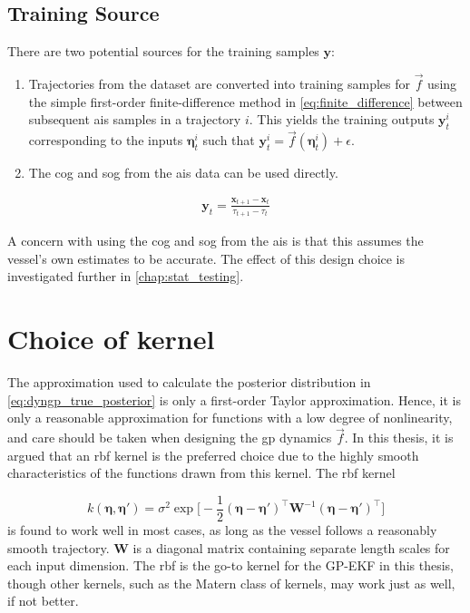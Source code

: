 \subsection{Training Source}
There are two potential sources for the training samples $\boldsymbol{y}$:

\begin{enumerate}
    \item Trajectories from the dataset are converted into training samples for $\vec{f}$ using the simple first-order finite-difference method in \cref{eq:finite_difference} between subsequent \acrshort{ais} samples in a trajectory $i$. This yields the training outputs $\boldsymbol{y}_t^{i}$ corresponding to the inputs $\boldsymbol{\eta}_t^i$ such that $\boldsymbol{y}_t^i = \vec{f}(\boldsymbol{\eta}_t^i) + \epsilon$.
    \item The \acrshort{cog} and \acrshort{sog} from the \acrshort{ais} data can be used directly.
\end{enumerate}

\begin{align}\label{eq:finite_difference}
    \boldsymbol{y}_t = \frac{\boldsymbol{x}_{t+1} - \boldsymbol{x}_t}{\tau_{t+1} - \tau_t}
\end{align}

A concern with using the \acrshort{cog} and \acrshort{sog} from the \acrshort{ais} is that this assumes the vessel's own estimates to be accurate. The effect of this design choice is investigated further in \cref{chap:stat_testing}.


\section{Choice of kernel}
The approximation used to calculate the posterior distribution in \cref{eq:dyngp_true_posterior} is only a first-order Taylor approximation. Hence, it is only a reasonable approximation for functions with a low degree of nonlinearity, and care should be taken when designing the \acrshort{gp} dynamics $\vec{f}$. In this thesis, it is argued that an \acrshort{rbf} kernel is the preferred choice due to the highly smooth characteristics of the functions drawn from this kernel. The \acrshort{rbf} kernel

\begin{equation}\label{eq:dyngp_kernel}
    k(\boldsymbol{\eta}, \boldsymbol{\eta}') = \sigma^2 \exp \big[ - \frac{1}{2} (\boldsymbol{\eta} - \boldsymbol{\eta}')^\intercal \boldsymbol{W}^{-1} (\boldsymbol{\eta} - \boldsymbol{\eta}')^\intercal\big]
\end{equation}
is found to work well in most cases, as long as the vessel follows a reasonably smooth trajectory. $\boldsymbol{W}$ is a diagonal matrix containing separate length scales for each input dimension. The \acrshort{rbf} is the go-to kernel for the GP-EKF in this thesis, though other kernels, such as the Matern class of kernels, may work just as well, if not better.

